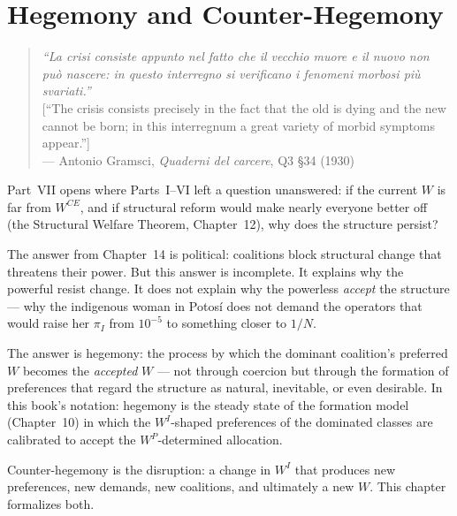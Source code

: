 \documentclass[../structural_economics_book.tex]{subfiles}
\begin{document}
\ifSubfilesClassLoaded{\setcounter{chapter}{23}}{}
\chapter{Hegemony and Counter-Hegemony}\label{ch:24}
\begin{quote}
\textit{``La crisi consiste appunto nel fatto che il vecchio muore e il nuovo non pu\`{o} nascere: in questo interregno si verificano i fenomeni morbosi pi\`{u} svariati.''}\\[0.3em]
\textnormal{[``The crisis consists precisely in the fact that the old is dying and the new cannot be born; in this interregnum a great variety of morbid symptoms appear.'']}\\
\hfill --- Antonio Gramsci, \textit{Quaderni del carcere}, Q3 \S34 (1930)
\end{quote}
\nocite{gramsci1975quaderni}

\vspace{1em}

Part~VII opens where Parts~I--VI left a question unanswered: if the current $W$ is far from $W^{CE}$, and if structural reform would make nearly everyone better off (the Structural Welfare Theorem, Chapter~12), why does the structure persist?

The answer from Chapter~14 is political: coalitions block structural change that threatens their power. But this answer is incomplete. It explains why the powerful resist change. It does not explain why the powerless \textit{accept} the structure --- why the indigenous woman in Potos\'{i} does not demand the operators that would raise her $\pi_I$ from $10^{-5}$ to something closer to $1/N$.

The answer is hegemony: the process by which the dominant coalition's preferred $W$ becomes the \textit{accepted} $W$ --- not through coercion but through the formation of preferences that regard the structure as natural, inevitable, or even desirable. In this book's notation: hegemony is the steady state of the formation model (Chapter~10) in which the $W^I$-shaped preferences of the dominated classes are calibrated to accept the $W^P$-determined allocation.

Counter-hegemony is the disruption: a change in $W^I$ that produces new preferences, new demands, new coalitions, and ultimately a new $W$. This chapter formalizes both.
\end{document}
